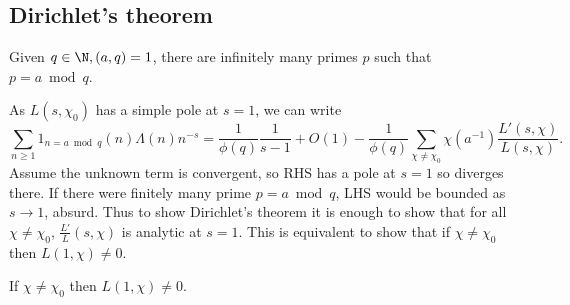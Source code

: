 \documentclass[a4paper]{article}
\theoremstyle{definition}
\begin{document}
\subsection{Dirichlet's theorem}

\begin{theorem}
  Given \(q \in \N, (a, q) = 1\), there are infinitely many primes \(p\) such that \(p = a \bmod q\).
\end{theorem}

As \(L(s, \chi_0)\) has a simple pole at \(s = 1\), we can write
\[
  \sum_{n \geq 1} 1_{n = a \bmod q} (n) \Lambda(n) n^{-s}
  = \frac{1}{\phi(q)} \frac{1}{s - 1} + O(1) - \frac{1}{\phi(q)} \sum_{\chi \neq \chi_0} \chi(a^{-1}) \frac{L'(s, \chi)}{L(s, \chi)}.
\]
Assume the unknown term is convergent, so RHS has a pole at \(s = 1\) so diverges there. If there were finitely many prime \(p = a \bmod q\), LHS would be bounded as \(s \to 1\), absurd. Thus to show Dirichlet's theorem it is enough to show that for all \(\chi \neq \chi_0\), \(\frac{L'}{L} (s, \chi)\) is analytic at \(s = 1\). This is equivalent to show that if \(\chi \neq \chi_0\) then \(L(1, \chi) \neq 0\).

\begin{theorem}
  If \(\chi \neq \chi_0\) then \(L(1, \chi) \neq 0\).
\end{theorem}
\end{document}
